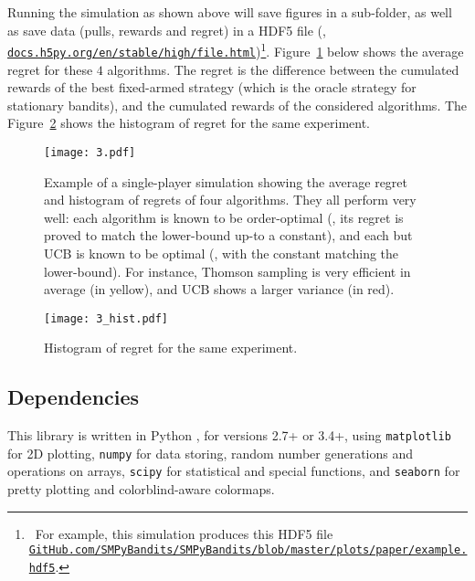 Running the simulation as shown above will save figures in a sub-folder, as well as save data (pulls, rewards and regret) in a HDF5 file (\cite{h5py}, \texttt{\href{http://docs.h5py.org/en/stable/high/file.html}{docs.h5py.org/en/stable/high/file.html}})\footnote{~For example, this simulation produces this HDF5 file \texttt{\href{https://github.com/SMPyBandits/SMPyBandits/blob/master/plots/paper/example.hdf5}{GitHub.com/SMPyBandits/SMPyBandits/blob/master/plots/paper/example.hdf5}}.}.
Figure~\ref{fig:3:firstPlot} below shows the average regret for these $4$ algorithms.
The regret is the difference between the cumulated rewards of the best fixed-armed strategy (which is the oracle strategy for stationary bandits), and the cumulated rewards of the considered algorithms.
The Figure~\ref{fig:3:firstPlot_hist} shows the histogram of regret for the same experiment.

\begin{figure}[h!]  %
	\centering
	\texttt{[image: 3.pdf]}
	\caption[Example of a single-player simulation showing the average regret and histogram of regrets of $4$ algorithms]{
		Example of a single-player simulation showing the average regret and histogram of regrets of four algorithms. They all perform very well: each algorithm is known to be order-optimal (\ie, its regret is proved to match the lower-bound up-to a constant), and each but UCB is known to be optimal (\ie, with the constant matching the lower-bound). For instance, Thomson sampling is very efficient in average (in yellow), and UCB shows a larger variance (in red).
	}
	\label{fig:3:firstPlot}
\end{figure}

\begin{figure}[h!]  %
	\centering
	\texttt{[image: 3\_hist.pdf]}
	\caption{Histogram of regret for the same experiment.}
	\label{fig:3:firstPlot_hist}
\end{figure}


\subsection{Dependencies}

This library is written in Python \cite{python}, for versions 2.7+ or 3.4+, using \texttt{matplotlib} \cite{matplotlib} for 2D plotting, \texttt{numpy} \cite{numpy} for data storing, random number generations and operations on arrays, \texttt{scipy} \cite{scipy} for statistical and special functions, and \texttt{seaborn} \cite{seaborn} for pretty plotting and colorblind-aware colormaps.

